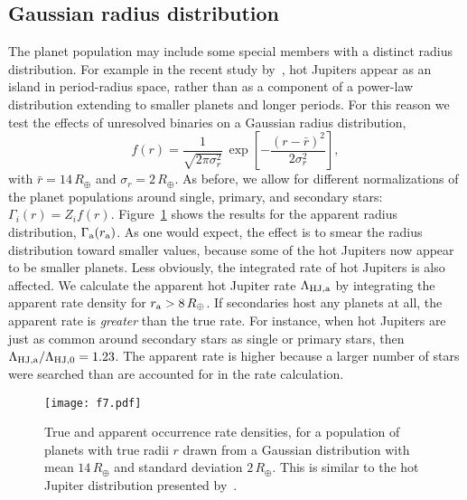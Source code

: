 \documentclass[12pt,modern,trackchanges]{aastex61}
\renewcommand{\a}{_{\rm a}}
\begin{document}

\subsection{Gaussian radius distribution}
\label{sec:hjs}

The planet population may include some special members with a distinct
radius distribution.  For example in the recent study
by~\citet{petigura_CKS_2017}, hot Jupiters appear as an island in
period-radius space, rather than as a component of a power-law
distribution extending to smaller planets and longer periods.  For
this reason we test the effects of unresolved binaries on a Gaussian
radius distribution,
\begin{equation}
    f(r) = 
    \frac{1}{\sqrt{2 \pi \sigma_r^2}} \,
    \exp \left[ -\frac{(r-\bar{r})^2}{2\sigma_r^2} \right],
\end{equation}
with $\bar{r} = 14\,R_\oplus$ and $\sigma_r = 2\,R_\oplus$.  As before,
we allow for different normalizations of the planet populations around
single, primary, and secondary stars: $\Gamma_i(r) = Z_i f(r)$.
Figure~\ref{fig:gaussian_HJ} shows the results for the apparent radius
distribution, $\Gamma\a(r\a)$.  As one would expect, the effect is to
smear the radius distribution toward smaller values, because some of
the hot Jupiters now appear to be smaller planets.  Less obviously,
the integrated rate of hot Jupiters is also affected.  We calculate
the apparent hot Jupiter rate $\Lambda_{\rm HJ,a}$ by integrating the
apparent rate density for $r\a > 8\,R_\oplus$.  If secondaries host
any planets at all, the apparent rate is {\it greater} than the true
rate.  For instance, when hot Jupiters are just as common around
secondary stars as single or primary stars, then $\Lambda_{\rm
HJ,a}/\Lambda_{{\rm HJ},0} = 1.23$.
The apparent rate is higher because a larger number of stars were
searched than are accounted for in the rate calculation.

\begin{figure}[!tb]
    \centering
    \texttt{[image: f7.pdf]}
    \caption{ True and apparent occurrence rate densities, for a
    population of planets with true radii $r$ drawn from a Gaussian
    distribution with mean $14\,R_\oplus$ and standard deviation
    $2\,R_\oplus$.  This is similar to the hot Jupiter distribution
    presented by~\citet{petigura_CKS_2017}.  }
    \label{fig:gaussian_HJ}
\end{figure}
\end{document}
